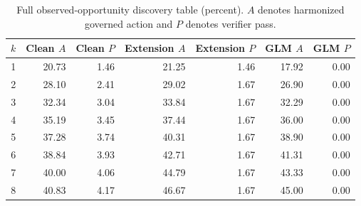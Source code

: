 
\begin{table}[H]
\centering
\caption{Full observed-opportunity discovery table (percent). $A$ denotes harmonized governed action and $P$ denotes verifier pass.}
\label{tab:opportunity-full}
\small
\setlength{\tabcolsep}{4pt}
\begin{tabular}{@{}rrrrrrr@{}}
\toprule
$k$ & Clean $A$ & Clean $P$ & Extension $A$ & Extension $P$ & GLM $A$ & GLM $P$ \\
\midrule
1 & 20.73 & 1.46 & 21.25 & 1.46 & 17.92 & 0.00 \\
2 & 28.10 & 2.41 & 29.02 & 1.67 & 26.90 & 0.00 \\
3 & 32.34 & 3.04 & 33.84 & 1.67 & 32.29 & 0.00 \\
4 & 35.19 & 3.45 & 37.44 & 1.67 & 36.00 & 0.00 \\
5 & 37.28 & 3.74 & 40.31 & 1.67 & 38.90 & 0.00 \\
6 & 38.84 & 3.93 & 42.71 & 1.67 & 41.31 & 0.00 \\
7 & 40.00 & 4.06 & 44.79 & 1.67 & 43.33 & 0.00 \\
8 & 40.83 & 4.17 & 46.67 & 1.67 & 45.00 & 0.00 \\
\bottomrule
\end{tabular}
\end{table}

